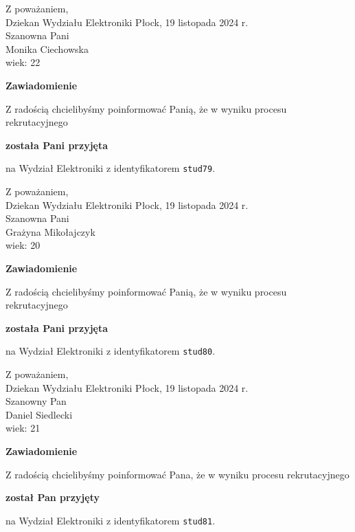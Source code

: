 \documentclass[12pt,a4paper]{article}
\begin{document}
\noindent
Z poważaniem,\\
Dziekan
Wydziału Elektroniki
\newpage
\hfill Płock, 19 listopada 2024 r.\\ 
\noindent 
Szanowna Pani \\
Monika Ciechowska \\
wiek: 22

\bigskip

\begin{center}
{\Large\textbf{Zawiadomienie}}
\end{center}
\bigskip
Z radością chcielibyśmy poinformować Panią, że w wyniku procesu rekrutacyjnego
\begin{center}
\textsf{\textbf{została Pani przyjęta}} 
\end{center}
na Wydział Elektroniki z identyfikatorem \verb|stud79|.
\vspace{2cm}

\noindent
Z poważaniem,\\
Dziekan
Wydziału Elektroniki
\newpage
\hfill Płock, 19 listopada 2024 r.\\ 
\noindent 
Szanowna Pani \\
Grażyna Mikołajczyk \\
wiek: 20

\bigskip

\begin{center}
{\Large\textbf{Zawiadomienie}}
\end{center}
\bigskip
Z radością chcielibyśmy poinformować Panią, że w wyniku procesu rekrutacyjnego
\begin{center}
\textsf{\textbf{została Pani przyjęta}} 
\end{center}
na Wydział Elektroniki z identyfikatorem \verb|stud80|.
\vspace{2cm}

\noindent
Z poważaniem,\\
Dziekan
Wydziału Elektroniki
\newpage
\hfill Płock, 19 listopada 2024 r.\\ 
\noindent 
Szanowny Pan \\
Daniel Siedlecki \\
wiek: 21

\bigskip

\begin{center}
{\Large\textbf{Zawiadomienie}}
\end{center}
\bigskip
Z radością chcielibyśmy poinformować Pana, że w wyniku procesu rekrutacyjnego
\begin{center}
\textsf{\textbf{został Pan przyjęty}} 
\end{center}
na Wydział Elektroniki z identyfikatorem \verb|stud81|.
\vspace{2cm}
\end{document}

